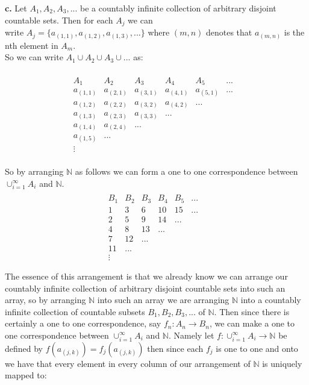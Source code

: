 \documentclass{article}
\begin{document}
{\Large \textbf{c.}} Let $A_1, A_2, A_3, ...$ be a countably infinite collection of arbitrary disjoint countable sets. Then for each $A_j$ we can 
\\ \indent\indent\indent\indent write $A_j = \{a_{(1,1)}, a_{(1,2)}, a_{(1,3)}, ...\}$ where $(m,n)$ denotes that $a_{(m,n)}$ is the nth element in $A_m$. 
\\ \indent\indent\indent\indent\indent\indent\indent\indent\indent\indent\indent\indent\indent So we can write $A_1\cup A_2\cup A_3\cup ...$ as:
\begin{center}
    \doublespacing
    \begin{singlespace}
        \[\begin{array}{ccccccc}
            &  \\A_1 & A_2 & A_3 & A_4 & A_5 & ...
            &  \\a_{(1,1)} & a_{(2,1)} & a_{(3,1)} & a_{(4,1)} & a_{(5,1)} & ...
            &  \\a_{(1,2)} & a_{(2,2)} & a_{(3,2)} & a_{(4,2)} & ...
            &  \\a_{(1,3)} & a_{(2,3)} & a_{(3,3)} & ...
            &  \\a_{(1,4)} & a_{(2,4)} & ...
            &  \\a_{(1,5)} & ...
            &  \\ \vdots
        \end{array}\]
        \\So by arranging $\mathbb{N}$ as follows we can form a one to one correspondence between $\cup _{i=1}^{\infty} A_i$ and $\mathbb{N}$.
        \[\begin{array}{ccccccc}
            &  \\B_1 & B_2 & B_3 & B_4 & B_5 & ...
            &  \\1 & 3 & 6 & 10 & 15 & ...
            &  \\2 & 5 & 9 & 14 & ...
            &  \\4 & 8 & 13 & ...
            &  \\7 & 12 & ...
            &  \\11 & ...
            &  \\ \vdots
        \end{array}\]
    \end{singlespace}
    The essence of this arrangement is that we already know we can arrange our countably infinite collection of arbitrary disjoint countable sets into such an array, so by arranging $\mathbb{N}$ into such an array we are arranging $\mathbb{N}$ into a countably infinite collection of countable subsets $B_1, B_2, B_3, ...$ of $\mathbb{N}$. Then since there is certainly a one to one correspondence, say $f_n: A_n\rightarrow B_n$, we can make a one to one correspondence between $\cup _{i=1}^{\infty} A_i$ and $\mathbb{N}$. Namely let $f: \cup _{i=1}^{\infty} A_i\rightarrow\mathbb{N}$ be defined by $f(a_{(j,k)}) = f_j (a_{(j,k)})$ then since each $f_j$ is one to one and onto we have that every element in every column of our arrangement of $\mathbb{N}$ is uniquely mapped to: 

\end{center}
\end{document}
